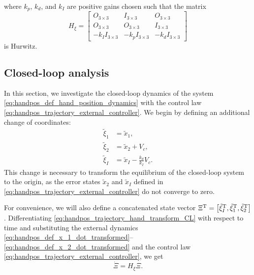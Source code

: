 \noindent where $k_p$, $k_d$, and $k_I$ are positive gains chosen such that the matrix
\begin{equation}
    H_{\xi}
    =
    \begin{bmatrix}
        O_{3 \times 3} & I_{3 \times 3} & O_{3 \times 3} \\ O_{3 \times 3} & O_{3 \times 3} & I_{3 \times 3} \\ -k_I I_{3 \times 3} & -k_p I_{3 \times 3} & -k_d I_{3 \times 3}
    \end{bmatrix} \label{eq:handpos_trajectory_H_xi}
\end{equation}
is Hurwitz.

\subsection{Closed-loop analysis}
In this section, we investigate the closed-loop dynamics of the system \eqref{eq:handpos_def_hand_position_dynamics} with the control law \eqref{eq:handpos_trajectory_external_controller}.
We begin by defining an additional change of coordinates:
\begin{subequations}
    \begin{align}
        \tilde{\xi}_1 &= \tilde{x}_1, \\
        \tilde{\xi}_2 &= \tilde{x}_2 + V_c, \\
        \tilde{\xi}_I &= \tilde{x}_I - \frac{k_d}{k_I}V_c.
    \end{align} \label{eq:handpos_trajectory_hand_transform_CL}
\end{subequations}
This change is necessary to transform the equilibrium of the closed-loop system to the origin, as the error states $\tilde{x}_2$ and $\tilde{x}_I$ defined in \eqref{eq:handpos_trajectory_external_controller} do not converge to zero.

For convenience, we will also define a concatenated state vector $\Xi^{\mathrm{T}} = \left[{\tilde{\xi}}_I^{\mathrm{T}}, {\tilde{\xi}}_1^{\mathrm{T}}, {\tilde{\xi}}_2^{\mathrm{T}}\right]$.
Differentiating \eqref{eq:handpos_trajectory_hand_transform_CL} with respect to time and substituting the external dynamics \eqref{eq:handpos_def_x_1_dot_transformed}--\eqref{eq:handpos_def_x_2_dot_transformed} and the control law \eqref{eq:handpos_trajectory_external_controller}, we get
\begin{equation}
    \dot{\Xi} = H_{\xi} \Xi. \label{eq:handpos_trajectory_external_dynamics}
\end{equation}

